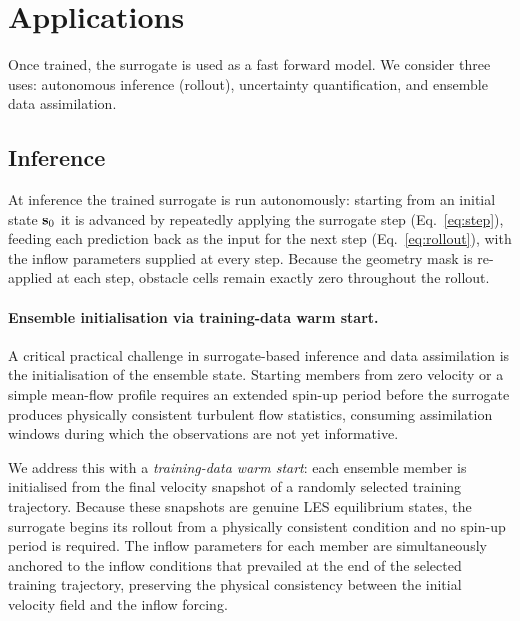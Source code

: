 \section{Applications}
\label{sec:applications}

Once trained, the surrogate is used as a fast forward model. We consider three
uses: autonomous inference (rollout), uncertainty quantification, and ensemble
data assimilation.

\subsection{Inference}
\label{sec:inference}

At inference the trained surrogate is run autonomously: starting from an initial
state $\mathbf{s}_0$ it is advanced by repeatedly applying the surrogate step
(Eq.~\ref{eq:step}), feeding each prediction back as the input for the next step
(Eq.~\ref{eq:rollout}), with the inflow parameters supplied at every step. Because
the geometry mask is re-applied at each step, obstacle cells remain exactly zero
throughout the rollout.

\paragraph{Ensemble initialisation via training-data warm start.}
\label{sec:warmstart}
A critical practical challenge in surrogate-based inference and data assimilation
is the
initialisation of the ensemble state. Starting members from zero velocity or
a simple mean-flow profile requires an extended spin-up period before the
surrogate produces physically consistent turbulent flow statistics, consuming
assimilation windows during which the observations are not yet informative.

We address this with a \emph{training-data warm start}: each ensemble member is
initialised from the final velocity snapshot of a randomly selected \palm{} training
trajectory. Because these snapshots are genuine LES equilibrium states, the
surrogate begins its rollout from a physically consistent condition and no
spin-up period is required. The inflow parameters for each member are
simultaneously anchored to the inflow conditions that prevailed at the end of the
selected training trajectory, preserving the physical consistency between the
initial velocity field and the inflow forcing.

